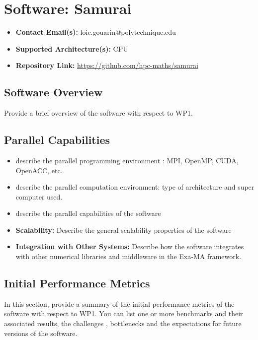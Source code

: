 \section{Software: Samurai}
\label{sec:WP1:Samurai:software}

\begin{itemize}
    \item \textbf{Contact Email(s):} loic.gouarin@polytechnique.edu
    \item \textbf{Supported Architecture(s):} CPU
    \item \textbf{Repository Link:} \href{https://github.com/hpc-maths/samurai}{https://github.com/hpc-maths/samurai}
\end{itemize}

\subsection{Software Overview}
\label{sec:WP1:Samurai:summary}

Provide a brief overview of the software with respect to WP1.

\subsection{Parallel Capabilities}
\label{sec:WP1:Samurai:performances}


\begin{itemize}
    \item describe the parallel programming  environment : MPI, OpenMP, CUDA, OpenACC, etc.
    \item describe the parallel computation environment: type of architecture and super computer used.
    \item describe the parallel capabilities of the software
    \item \textbf{Scalability:} Describe the general scalability properties of the software
    \item \textbf{Integration with Other Systems:} Describe how the software integrates with other numerical libraries and middleware in the Exa-MA framework.
\end{itemize}

\subsection{Initial Performance Metrics}
\label{sec:WP1:Samurai:metrics}

In this section, provide a summary of the initial performance metrics of the software with respect to WP1.
You can list one or more benchmarks and their associated results, the challenges , bottlenecks and the expectations for future versions of the software.



